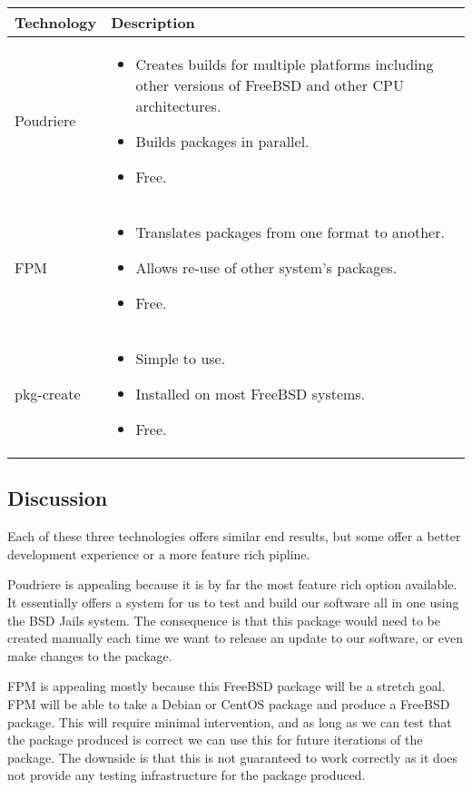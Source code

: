 \begin{center}
  \begin{tabular}{ | l | p{10cm} |}
    \hline
    Technology & Description  \\ \hline
    Poudriere \cite{poudriere-tutorial} &
    \begin{itemize}
      \item Creates builds for multiple platforms including other versions of FreeBSD and other CPU architectures.
      \item Builds packages in parallel.
      \item Free.
    \end{itemize}\\ \hline
    FPM \cite{fpm-home} &
    \begin{itemize}
      \item Translates packages from one format to another.
      \item Allows re-use of other system's packages.
      \item Free.
    \end{itemize}\\ \hline
    pkg-create \cite{pkg-create-man} &
    \begin{itemize}
      \item Simple to use.
      \item Installed on most FreeBSD systems.
      \item Free.
    \end{itemize}\\ \hline
  \end{tabular}
\end{center}

\subsection{Discussion}

Each of these three technologies offers similar end results, but some offer a better development experience or a more feature rich pipline.

Poudriere is appealing because it is by far the most feature rich option available.
It essentially offers a system for us to test and build our software all in one using the BSD Jails system.
The consequence is that this package would need to be created manually each time we want to release an update to our software, or even make changes to the package.

FPM is appealing mostly because this FreeBSD package will be a stretch goal.
FPM will be able to take a Debian or CentOS package and produce a FreeBSD package.
This will require minimal intervention, and as long as we can test that the package produced is correct we can use this for future iterations of the package.
The downside is that this is not guaranteed to work correctly as it does not provide any testing infrastructure for the package produced.

